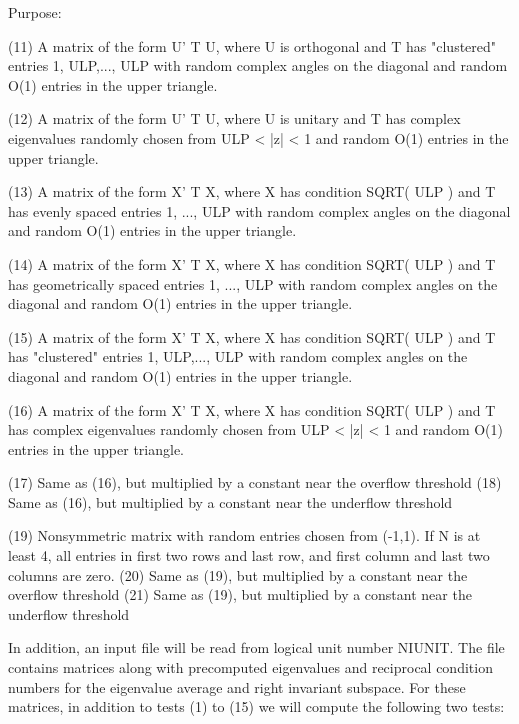 \begin{DoxyParagraph}{Purpose\+: }
\begin{DoxyVerb}
    (11) A matrix of the form  U' T U, where U is orthogonal and
         T has "clustered" entries 1, ULP,..., ULP with random
         complex angles on the diagonal and random O(1) entries in
         the upper triangle.

    (12) A matrix of the form  U' T U, where U is unitary and
         T has complex eigenvalues randomly chosen from
         ULP < |z| < 1   and random O(1) entries in the upper
         triangle.

    (13) A matrix of the form  X' T X, where X has condition
         SQRT( ULP ) and T has evenly spaced entries 1, ..., ULP
         with random complex angles on the diagonal and random O(1)
         entries in the upper triangle.

    (14) A matrix of the form  X' T X, where X has condition
         SQRT( ULP ) and T has geometrically spaced entries
         1, ..., ULP with random complex angles on the diagonal
         and random O(1) entries in the upper triangle.

    (15) A matrix of the form  X' T X, where X has condition
         SQRT( ULP ) and T has "clustered" entries 1, ULP,..., ULP
         with random complex angles on the diagonal and random O(1)
         entries in the upper triangle.

    (16) A matrix of the form  X' T X, where X has condition
         SQRT( ULP ) and T has complex eigenvalues randomly chosen
         from ULP < |z| < 1 and random O(1) entries in the upper
         triangle.

    (17) Same as (16), but multiplied by a constant
         near the overflow threshold
    (18) Same as (16), but multiplied by a constant
         near the underflow threshold

    (19) Nonsymmetric matrix with random entries chosen from (-1,1).
         If N is at least 4, all entries in first two rows and last
         row, and first column and last two columns are zero.
    (20) Same as (19), but multiplied by a constant
         near the overflow threshold
    (21) Same as (19), but multiplied by a constant
         near the underflow threshold

    In addition, an input file will be read from logical unit number
    NIUNIT. The file contains matrices along with precomputed
    eigenvalues and reciprocal condition numbers for the eigenvalue
    average and right invariant subspace. For these matrices, in
    addition to tests (1) to (15) we will compute the following two
    tests:


\end{DoxyVerb}
\end{DoxyParagraph}
